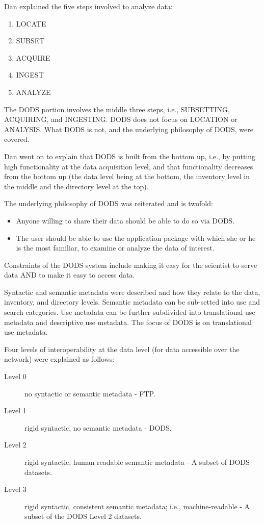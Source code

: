 Dan explained the five steps involved to analyze data:
\begin{enumerate}
\item LOCATE
\item SUBSET
\item ACQUIRE
\item INGEST
\item ANALYZE
\end{enumerate}

The DODS portion involves the middle three steps, i.e., SUBSETTING, ACQUIRING, 
and INGESTING.  DODS does not focus on LOCATION or ANALYSIS.  What DODS 
is not, and the underlying philosophy of DODS, were covered.

Dan went on to explain that DODS is built from the bottom up, i.e., by
putting high functionality at the data acquisition level, and that
functionality decreases from the bottom up (the data level being at
the bottom, the inventory level in the middle and the directory level
at the top).

The underlying philosophy of DODS was reiterated and is twofold:
\begin{itemize}
\item Anyone willing to share their data should be able to do so via DODS.
\item The user should be able to use the application package with
  which she or he is the most familiar, to examine or analyze the data
  of interest.
\end{itemize}

Constraints of the DODS system include making it easy for the
scientist to serve data AND to make it easy to access data.

Syntactic and semantic metadata were described and how they relate to
the data, inventory, and directory levels.  Semantic metadata can be
sub-setted into use and search categories.  Use metadata can be
further subdivided into translational use metadata and descriptive use
metadata. The focus of DODS is on translational use metadata.

Four levels of interoperability at the data level (for data accessible
over the network) were explained as follows:
\begin{description}
\item[Level 0]  no syntactic or semantic metadata - FTP.
\item[Level 1]  rigid syntactic, no semantic metadata - DODS.
\item[Level 2] rigid syntactic, human readable semantic metadata - A
  subset of DODS datasets.
\item[Level 3] rigid syntactic, consistent semantic metadata; i.e.,
  machine-readable - A subset of the DODS Level 2 datasets.
\end{description}

